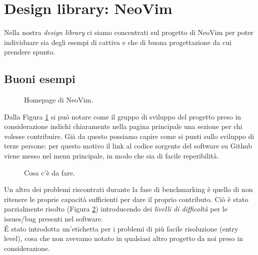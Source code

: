 \documentclass[12pt]{article} %
\begin{document}
\section{Design library: NeoVim}
Nella nostra \emph{design library} ci siamo concentrati sul progetto di NeoVim per poter individuare sia degli esempi di cattiva e che di buona progettazione da cui prendere spunto.\\
\subsection{Buoni esempi}

\begin{figure}[H] 
\caption{Homepage di NeoVim.}
\label{fig:buonesempio1}
\end{figure}

Dalla Figura \ref{fig:buonesempio1} si pu\'o notare come il gruppo di sviluppo del progetto preso in considerazione indichi chiaramente nella pagina principale una sezione per chi volesse contribuire. Già da questo possiamo capire come si punti sullo sviluppo di terze persone: per questo motivo il link al codice sorgente del software su Github viene messo nel menu principale, in modo che sia di facile reperibilità.

\begin{figure}[H] 
\caption{Cosa c'è da fare.}
\label{fig:buonesempio2}
\end{figure}

Un altro dei problemi riscontrati durante la fase di benchmarking è quello di non ritenere le proprie capacità sufficienti per dare il proprio contributo. Ciò è stato parzialmente risolto (Figura \ref{fig:buonesempio2}) introducendo dei \emph{livelli di difficoltà} per le issues/bug presenti nel software.\\
\'E stato introdotta un'etichetta per i problemi di più facile risoluzione (entry level), cosa che non avevamo notato in qualsiasi altro progetto da noi preso in considerazione.
\end{document}
